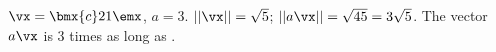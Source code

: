 {$\vx = \bmx{c} 2\\1\emx$, $a = 3$.}
{$||\vx|| = \sqrt{5}$; $||a\vx|| = \sqrt{45} = 3\sqrt{5}$. The vector $a\vx$ is 3 times as long as \vx.}